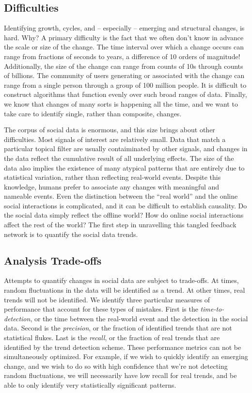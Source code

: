 \documentclass{article}
\begin{document}
\subsection{Difficulties} Identifying growth, cycles, and -- especially -- emerging
and structural changes, is hard. Why? A primary difficulty is the fact that we
often don't know in advance the scale or size of the change. The time interval
over which a change occurs can range from fractions of seconds to years, a
difference of 10 orders of magnitude! Additionally, the size of the change can range from
counts of 10s through counts of billions. The community of users generating or
associated with the change can range from a single person through a group of
100 million people. It is difficult to construct algorithms that function
evenly over such broad ranges of data. Finally, we know that changes of many
sorts is happening all the time, and we want to take care to identify single,
rather than composite, changes.

The corpus of social data is enormous, and this size brings about other
difficulties. Most signals of interest are relatively small.  Data that match a
particular topical filter are usually contaiminated by other signals, and
changes in the data reflect the cumulative result of all underlying effects.
The size of the data also implies the existence of many atypical patterns that
are entirely due to statistical variation, rather than reflecting real-world
events. Despite this knowledge, humans prefer to associate any changes with
meaningful and nameable events. 
Even the distinction between the “real world” and the online social
interactions is complicated, and it can be difficult to establish causality. Do
the social data simply reflect the offline world? How do online social
interactions affect the rest of the world?  The first step in unravelling this
tangled feedback network is to quantify the social data trends.  

\subsection{Analysis Trade-offs}
Attempts to quantify changes in social data are subject to trade-offs. 
At times, random fluctuations in the data will be identified as a trend.
At other times, real trends will not be identified. We identify three 
particular measures of performance that account for these types of mistakes.
First is the \textit{time-to-detection}, or the time between the
real-world event and the detection in the social data. 
Second is the \textit{precision}, or the fraction of identified trends 
that are not statistical flukes. 
Last is the \textit{recall}, or the fraction of real trends that are identified
by the trend detection scheme.
These performance metrics can not be simultaneously optimized.
For example, if we wish to quickly identify an
emerging change, and we wish to do so with high confidence that we’re not
detecting random fluctuations, we will necessarily have 
low recall for real trends, and be 
able to only identify very statistically significant patterns.
\end{document}
